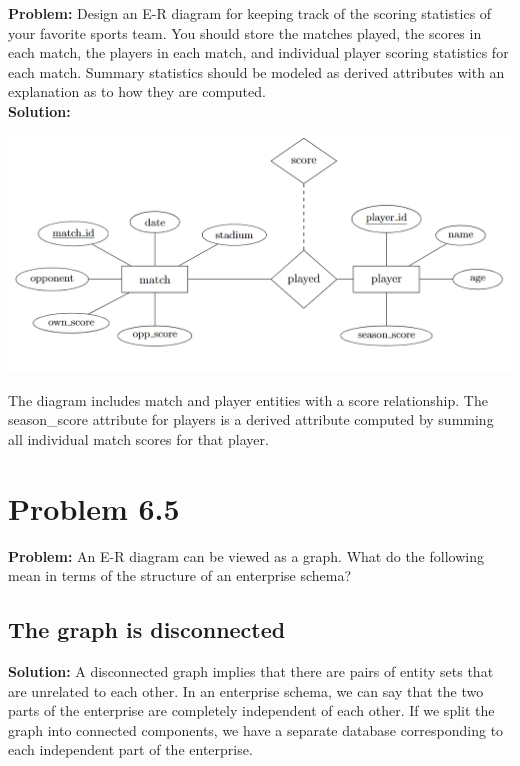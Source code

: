 \documentclass[12pt,a4paper]{article}
\begin{document}
\textbf{Problem:} Design an E-R diagram for keeping track of the scoring statistics of your favorite sports team. You should store the matches played, the scores in each match, the players in each match, and individual player scoring statistics for each match. Summary statistics should be modeled as derived attributes with an explanation as to how they are computed.
\\
\textbf{Solution:}

\begin{center}
\includegraphics[width=1\textwidth]{6.3.png}
\end{center}

The diagram includes match and player entities with a score relationship. The season\_score attribute for players is a derived attribute computed by summing all individual match scores for that player.

\section*{Problem 6.5}

\textbf{Problem:} An E-R diagram can be viewed as a graph. What do the following mean in terms of the structure of an enterprise schema?

\subsection*{The graph is disconnected}

\textbf{Solution:}  A disconnected graph implies that there are pairs of entity sets that are unrelated to each other. In an enterprise schema, we can say that the two parts of the enterprise are completely independent of each other. If we split the graph into connected components, we have a separate database corresponding to each independent part of the enterprise.
\end{document}

